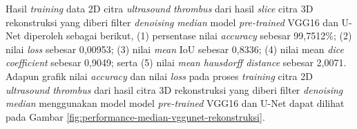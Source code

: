 \begin{enumerate}
	
	Hasil \textit{training} data 2D citra \textit{ultrasound} \textit{thrombus} dari hasil \textit{slice} citra 3D rekonstruksi yang diberi filter \textit{denoising} \textit{median} model \textit{pre-trained} VGG16 dan U-Net diperoleh sebagai berikut, (1) persentase nilai \textit{accuracy} sebesar 99,7512\%; (2) nilai \textit{loss} sebesar 0,00953; (3) nilai \textit{mean} IoU sebesar 0,8336; (4) nilai mean \textit{dice coefficient} sebesar 0,9049; serta (5) nilai \textit{mean hausdorff distance} sebesar 2,0071. Adapun grafik nilai \textit{accuracy} dan nilai \textit{loss} pada proses \textit{training} citra 2D \textit{ultrasound} \textit{thrombus} dari hasil citra 3D rekonstruksi yang diberi filter \textit{denoising} \textit{median} menggunakan model model \textit{pre-trained} VGG16 dan U-Net dapat dilihat pada Gambar \ref{fig:performance-median-vggunet-rekonstruksi}.
	

\end{enumerate}
